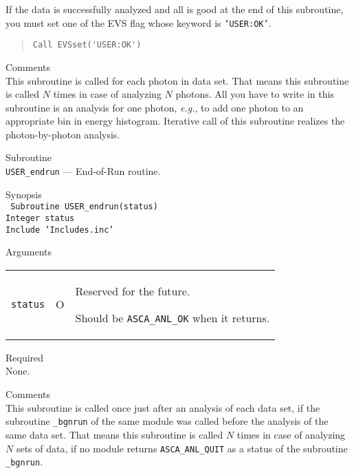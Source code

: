 \begin{description}
   If the data is successfully analyzed and all is good at the end of this 
   subroutine,
   you must set one of the EVS flag whose keyword is {\tt 'USER:OK'}.
\begin{quote}\baselineskip 3.2mm\begin{verbatim}
Call EVSset('USER:OK')
\end{verbatim}\end{quote}
\item{Comments} \\
   This subroutine is called for each photon in data set.
   That means
   this subroutine is called $N$ times
   in case of analyzing $N$ photons.
   All you have to write in this subroutine
   is an analysis for one photon,
   {\em e.g.},
   to add one photon to an appropriate bin in energy histogram.
   Iterative call of this subroutine realizes the photon-by-photon analysis.
\end{description}

\vspace{1cm}

\newpage
\begin{description}
\item{Subroutine}\\
   {\tt USER\_endrun} --- End-of-Run routine.
\item{Synopsis}\\
   {\tt
      Subroutine USER\_endrun(status) \\
      Integer status \\
      Include 'Includes.inc'
   }
\item{Arguments} \\
 \begin{tabular}{l@{\ (}c@{)\ }p{}}
   {\tt status} & O & Reserved for the future.\par
                      Should be {\tt ASCA\_ANL\_OK} when it returns.
 \end{tabular}
\item{Required} \\
   None.
\item{Comments} \\
   This subroutine is called once
   just after an analysis of each data set,
   if the subroutine {\tt *\_bgnrun} of the same module was called
   before the analysis of the same data set.
   That means
   this subroutine is called $N$ times
   in case of analyzing $N$ sets of data,
   if no module returns {\tt ASCA\_ANL\_QUIT}
   as a status of the subroutine {\tt *\_bgnrun}.
\end{description}

